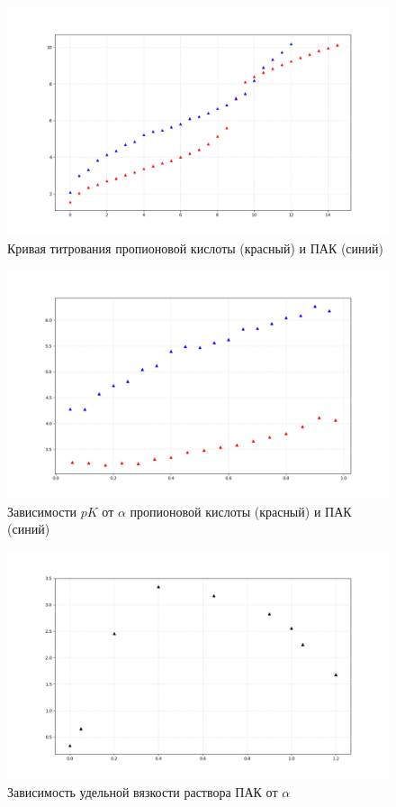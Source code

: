 \documentclass[12pt]{article}
\begin{document}
\begin{figure}
	\includegraphics[width = \linewidth]{../titr.png}
	\caption{Кривая титрования пропионовой кислоты (красный) и ПАК (синий)}
\end{figure}

\begin{figure}
	\includegraphics[width = \linewidth]{../pk.png}
	\caption{Зависимости $pK$ от $\alpha$ пропионовой кислоты (красный) и ПАК (синий)}
\end{figure}

\begin{figure}
	\includegraphics[width = \linewidth]{../eta.png}
	\caption{Зависимость удельной вязкости раствора ПАК от $\alpha$}
\end{figure}
\end{document}

